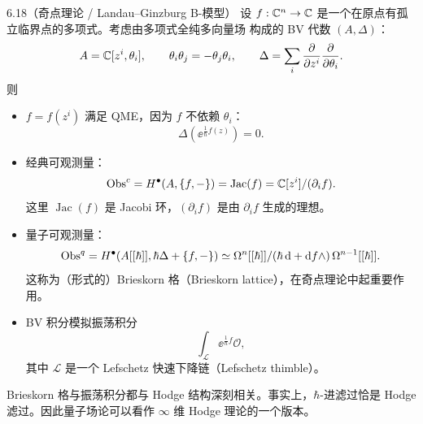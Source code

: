 

\begin{wexam}{6.18}（奇点理论 / Landau--Ginzburg B-模型）
  设 $f:\mathbb{C}^n\to\mathbb{C}$ 是一个在原点有孤立临界点的多项式。考虑由多项式全纯多向量场
  构成的 BV 代数 $(A,\Delta)$：
  \[
    A = \mathbb{C}[z^i,\theta_i],\qquad \theta_i\theta_j = -\theta_j\theta_i,\qquad
    \Delta = \sum_i \frac{\partial}{\partial z^i}\frac{\partial}{\partial \theta_i}.
  \]
  则
  \begin{itemize}[leftmargin=1.6em,itemsep=0.25em]
    \item $f = f(z^i)$ 满足 QME，因为 $f$ 不依赖 $\theta_i$：
      \[
        \Delta\left(\ee^{\frac{1}{\hbar}f(z)}\right) = 0.
      \]
    \item 经典可观测量：
      \[
        \operatorname{Obs}^c = H^\bullet(A,\{f,-\}) = \operatorname{Jac}(f)
        = \mathbb{C}[z^i]/(\partial_i f).
      \]
      这里 $\operatorname{Jac}(f)$ 是 Jacobi 环，$(\partial_i f)$ 是由
      $\partial_i f$ 生成的理想。
    \item 量子可观测量：
      \[
        \operatorname{Obs}^q = H^\bullet(A[[\hbar]],\hbar\Delta+\{f,-\})
        \simeq \Omega^n[[\hbar]]/(\hbar\,\mathrm{d} + \mathrm{d} f\wedge)\,\Omega^{n-1}[[\hbar]].
      \]
      这称为（形式的）Brieskorn 格（Brieskorn lattice），在奇点理论中起重要作用。
    \item BV 积分模拟振荡积分
      \[
        \int_{\mathcal{L}} \ee^{\frac{1}{\hbar}f}\mathcal{O},
      \]
      其中 $\mathcal{L}$ 是一个 Lefschetz 快速下降链（Lefschetz thimble）。
  \end{itemize}
  Brieskorn 格与振荡积分都与 Hodge 结构深刻相关。事实上，$\hbar$-进滤过恰是
  Hodge 滤过。因此量子场论可以看作 $\infty$ 维 Hodge 理论的一个版本。
\end{wexam}


